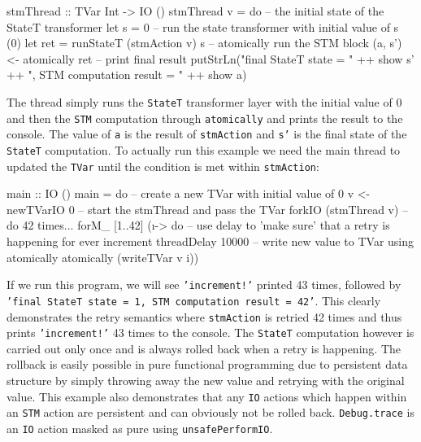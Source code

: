 \begin{HaskellCode}
stmThread :: TVar Int -> IO ()
stmThread v = do
  -- the initial state of the StateT transformer
  let s = 0
  -- run the state transformer with initial value of s (0)
  let ret = runStateT (stmAction v) s
  -- atomically run the STM block
  (a, s') <- atomically ret
  -- print final result
  putStrLn("final StateT state     = " ++ show s' ++
           ", STM computation result = " ++ show a)
\end{HaskellCode}

The thread simply runs the \texttt{StateT} transformer layer with the initial value of 0 and then the \texttt{STM} computation through \texttt{atomically} and prints the result to the console. The value of \texttt{a} is the result of \texttt{stmAction} and \texttt{s'} is the final state of the \texttt{StateT} computation. To actually run this example we need the main thread to updated the \texttt{TVar} until the condition is met within \texttt{stmAction}:

\begin{HaskellCode}
main :: IO ()
main = do
  -- create a new TVar with initial value of 0
  v <- newTVarIO 0 
  -- start the stmThread and pass the TVar
  forkIO (stmThread v)
  -- do 42 times...
  forM_ [1..42] (\i -> do
    -- use delay to 'make sure' that a retry is happening for ever increment
    threadDelay 10000
    -- write new value to TVar using atomically
    atomically (writeTVar v i))
\end{HaskellCode}

If we run this program, we will see \texttt{'increment!'} printed 43 times, followed by \texttt{'final StateT state = 1, STM computation result = 42'}. This clearly demonstrates the retry semantics where \texttt{stmAction} is retried 42 times and thus prints \texttt{'increment!'} 43 times to the console. The \texttt{StateT} computation however is carried out only once and is always rolled back when a retry is happening. The rollback is easily possible in pure functional programming due to persistent data structure by simply throwing away the new value and retrying with the original value. This example also demonstrates that any \texttt{IO} actions which happen within an \texttt{STM} action are persistent and can obviously not be rolled back. \texttt{Debug.trace} is an \texttt{IO} action masked as pure using \texttt{unsafePerformIO}.